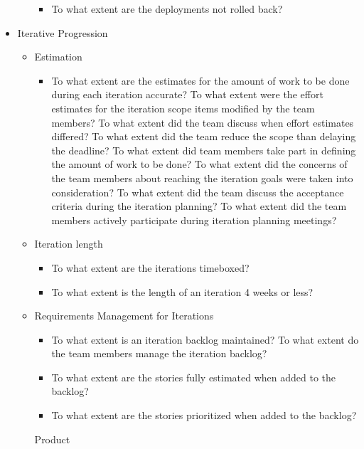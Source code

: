 \begin{itemize}
\begin{itemize}
\begin{itemize}
					\item To what extent are the deployments not rolled back?
				\end{itemize}
		\end{itemize}
	\item Iterative Progression
		\begin{itemize}
			\item Estimation
				\begin{itemize}
					\item To what extent are the estimates for the amount of work to be done during each iteration accurate?
					\addition To what extent were the effort estimates for the iteration scope items modified by the team members?
					\addition To what extent did the team discuss when effort estimates differed?  
					\addition To what extent did the team reduce the scope than delaying the deadline?
					\addition To what extent did team members take part in defining the amount of work to be done?
					\addition To what extent did the concerns of the team members about reaching the iteration goals were taken into consideration?
					\addition To what extent did the team discuss the acceptance criteria during the iteration planning?
					\addition To what extent did the team members actively participate during iteration planning meetings?
				\end{itemize}
			\item Iteration length
				\begin{itemize}
					\item To what extent are the iterations timeboxed?
					\item To what extent is the length of an iteration 4 weeks or less?
				\end{itemize}
			\item Requirements Management for Iterations
				\begin{itemize}
					\item To what extent is an iteration backlog maintained?
					\addition To what extent do the team members manage the iteration backlog? 
					\item To what extent are the stories fully estimated when added to the backlog?
					\item To what extent are the stories prioritized when added to the backlog?
				\end{itemize}
			\indicatorAddition Product
				\begin{itemize}

\end{itemize}
\end{itemize}
\end{itemize}
